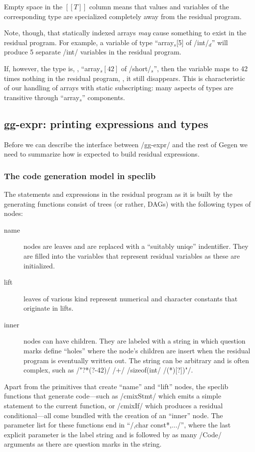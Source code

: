 \begin{docpart}
Empty space in the $[\![T]\!]$ column means that values and variables
of the corresponding type are specialized completely away from the
residual program.

Note, though, that statically indexed arrays \emph{may} cause
something to exist in the residual program. For example, a variable
of type ``array$_s$[5] of /int/$_d$'' will produce 5 separate /int/
variables in the residual program.

If, however, the type is, \eg, ``array$_s[42]$ of /short/$_s$'', then the
variable maps to 42 times nothing in the residual program, \ie, it
still disappears. This is characteristic of our handling of arrays
with static subscripting: many aspects of types are transitive
through ``array$_s$'' components.

\subsection{gg-expr: printing expressions and types}

Before we can describe the interface between /gg-expr/ and the
rest of Gegen we need to summarize how \Pgen is expected to
build residual expressions.

\subsubsection{The code generation model in speclib}

The statements and expressions in the residual program as it is
built by the generating functions consist of trees (or rather, DAGs)
with the following types of nodes:
\begin{description}
\item[name] nodes are leaves and are replaced with a ``suitably
    uniqe'' indentifier. They are filled into the \Pgen variables
    that represent residual variables as these are initialized.
\item[lift] leaves of various kind represent numerical and character
    constants that originate in lifts.
\item[inner] nodes can have children. They are labeled with a
    string in which question marks define ``holes'' where the
    node's children are insert when the residual program is
    eventually written out. The string can be arbitrary and is
    often complex, such as /"?*(?-42)/ /+/ /sizeof(int/ /(*)[?])"/.
\end{description}

Apart from the primitives that create ``name'' and ``lift'' nodes,
the speclib functions that generate code---such as /cmixStmt/ which
emits a simple statement to the current function, or /cmixIf/ which
produces a residual conditional---all come bundled with the
creation of an ``inner'' node. The parameter list for these functions
end in ``/,char const*,.../'', where the last explicit parameter
is the label string and is followed by as many /Code/ arguments
as there are question marks in the string.


\end{docpart}
